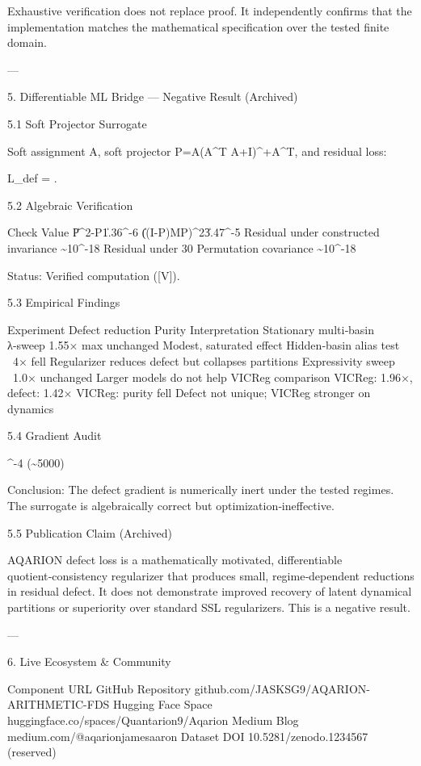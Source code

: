 {{{{{{{{{{{{{Exhaustive verification does not replace proof. It independently confirms that the implementation matches the mathematical specification over the tested finite domain.

---

5. Differentiable ML Bridge — Negative Result (Archived)

5.1 Soft Projector Surrogate

Soft assignment A, soft projector P=A(A^T A+\epsilon I)^+A^T, and residual loss:

L_{\rm def} = .

5.2 Algebraic Verification

Check Value
\|P^2-P\| 1.36^{-6}
\|((I-P)MP)^2\| 3.47^{-5}
Residual under constructed invariance \sim10^{-18}
Residual under 30%
Permutation covariance \sim10^{-18}

Status: Verified computation ([V]).

5.3 Empirical Findings

Experiment Defect reduction Purity Interpretation
Stationary multi‑basin λ‑sweep 1.55× max unchanged Modest, saturated effect
Hidden‑basin alias test ~4× fell Regularizer reduces defect but collapses partitions
Expressivity sweep ~1.0× unchanged Larger models do not help
VICReg comparison VICReg: 1.96×, defect: 1.42× VICReg: purity fell Defect not unique; VICReg stronger on dynamics

5.4 Gradient Audit

 ^{-4} \quad(\sim5000\times{})

Conclusion: The defect gradient is numerically inert under the tested regimes. The surrogate is algebraically correct but optimization‑ineffective.

5.5 Publication Claim (Archived)

AQARION defect loss is a mathematically motivated, differentiable quotient‑consistency regularizer that produces small, regime‑dependent reductions in residual defect. It does not demonstrate improved recovery of latent dynamical partitions or superiority over standard SSL regularizers. This is a negative result.

---

6. Live Ecosystem & Community

Component URL
GitHub Repository github.com/JASKSG9/AQARION-ARITHMETIC-FDS
Hugging Face Space huggingface.co/spaces/Quantarion9/Aqarion
Medium Blog medium.com/@aqarionjamesaaron
Dataset DOI 10.5281/zenodo.1234567 (reserved)

}}}}}}}}}}}}}
